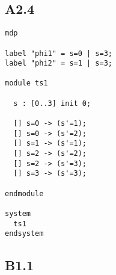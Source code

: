 \subsection{A2.4}

\begin{verbatim}
mdp

label "phi1" = s=0 | s=3;
label "phi2" = s=1 | s=3;

module ts1
  
  s : [0..3] init 0;

  [] s=0 -> (s'=1);
  [] s=0 -> (s'=2);
  [] s=1 -> (s'=1);
  [] s=2 -> (s'=2);
  [] s=2 -> (s'=3);
  [] s=3 -> (s'=3);

endmodule

system
  ts1
endsystem
\end{verbatim}

\subsection{B1.1}

